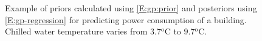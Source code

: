 \fi

\begin{figure}[!tb]
  \centering
	\setlength{}
	\setlength{}	
	  
  \caption{Example of priors calculated using \eqref{E:gp:prior} and posteriors using \eqref{E:gp-regression} for predicting power consumption of a building. Chilled water temperature varies from \(3.7\mathrm{^oC}\) to \(9.7\mathrm{^oC}\).}
  \captionsetup{justification=centering}
  \label{F:GP}
\end{figure}

